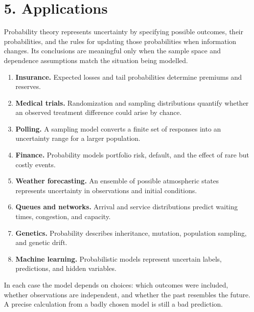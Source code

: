 \section*{5. Applications}
Probability theory represents uncertainty by specifying possible outcomes, their probabilities, and the rules for updating those probabilities when information changes. Its conclusions are meaningful only when the sample space and dependence assumptions match the situation being modelled.
\begin{enumerate}[leftmargin=*,itemsep=0.35em]
\item \textbf{Insurance.} Expected losses and tail probabilities determine premiums and reserves.
\item \textbf{Medical trials.} Randomization and sampling distributions quantify whether an observed treatment difference could arise by chance.
\item \textbf{Polling.} A sampling model converts a finite set of responses into an uncertainty range for a larger population.
\item \textbf{Finance.} Probability models portfolio risk, default, and the effect of rare but costly events.
\item \textbf{Weather forecasting.} An ensemble of possible atmospheric states represents uncertainty in observations and initial conditions.
\item \textbf{Queues and networks.} Arrival and service distributions predict waiting times, congestion, and capacity.
\item \textbf{Genetics.} Probability describes inheritance, mutation, population sampling, and genetic drift.
\item \textbf{Machine learning.} Probabilistic models represent uncertain labels, predictions, and hidden variables.
\end{enumerate}
In each case the model depends on choices: which outcomes were included, whether observations are independent, and whether the past resembles the future. A precise calculation from a badly chosen model is still a bad prediction.

